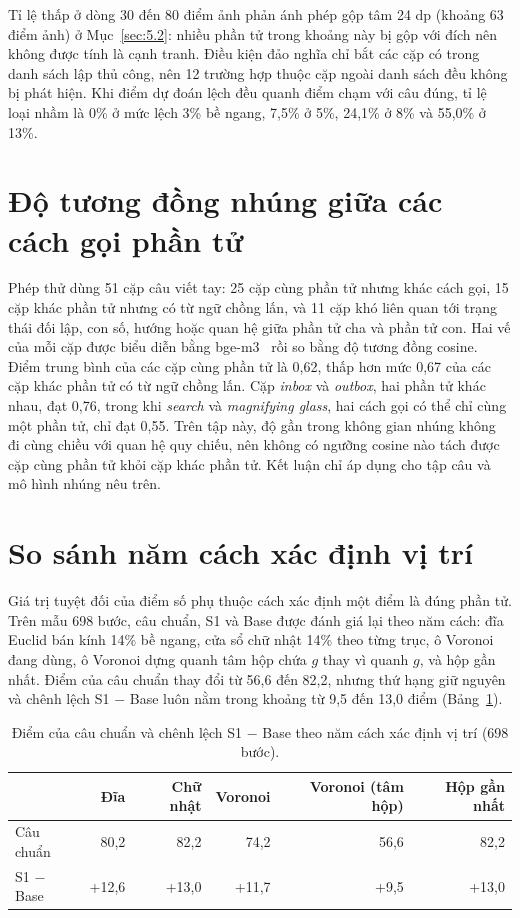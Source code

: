 Tỉ lệ thấp ở dòng 30 đến 80 điểm ảnh phản ánh phép gộp tâm 24 dp (khoảng 63 điểm ảnh) ở Mục~\ref{sec:5.2}: nhiều phần tử trong khoảng này bị gộp với đích nên không được tính là cạnh tranh. Điều kiện đảo nghĩa chỉ bắt các cặp có trong danh sách lập thủ công, nên 12 trường hợp thuộc cặp ngoài danh sách đều không bị phát hiện. Khi điểm dự đoán lệch đều quanh điểm chạm với câu đúng, tỉ lệ loại nhầm là 0\% ở mức lệch 3\% bề ngang, 7,5\% ở 5\%, 24,1\% ở 8\% và 55,0\% ở 13\%.

\section{Độ tương đồng nhúng giữa các cách gọi phần tử}\label{sec:B.2}

Phép thử dùng 51 cặp câu viết tay: 25 cặp cùng phần tử nhưng khác cách gọi, 15 cặp khác phần tử nhưng có từ ngữ chồng lấn, và 11 cặp khó liên quan tới trạng thái đối lập, con số, hướng hoặc quan hệ giữa phần tử cha và phần tử con. Hai vế của mỗi cặp được biểu diễn bằng bge-m3~\cite{bgem3} rồi so bằng độ tương đồng cosine. Điểm trung bình của các cặp cùng phần tử là 0,62, thấp hơn mức 0,67 của các cặp khác phần tử có từ ngữ chồng lấn. Cặp \emph{inbox} và \emph{outbox}, hai phần tử khác nhau, đạt 0,76, trong khi \emph{search} và \emph{magnifying glass}, hai cách gọi có thể chỉ cùng một phần tử, chỉ đạt 0,55. Trên tập này, độ gần trong không gian nhúng không đi cùng chiều với quan hệ quy chiếu, nên không có ngưỡng cosine nào tách được cặp cùng phần tử khỏi cặp khác phần tử. Kết luận chỉ áp dụng cho tập câu và mô hình nhúng nêu trên.

\section{So sánh năm cách xác định vị trí}\label{sec:B.3}

Giá trị tuyệt đối của điểm số phụ thuộc cách xác định một điểm là đúng phần tử. Trên mẫu 698 bước, câu chuẩn, S1 và Base được đánh giá lại theo năm cách: đĩa Euclid bán kính 14\% bề ngang, cửa sổ chữ nhật 14\% theo từng trục, ô Voronoi đang dùng, ô Voronoi dựng quanh tâm hộp chứa $g$ thay vì quanh $g$, và hộp gần nhất. Điểm của câu chuẩn thay đổi từ 56,6 đến 82,2, nhưng thứ hạng giữ nguyên và chênh lệch S1 $-$ Base luôn nằm trong khoảng từ 9,5 đến 13,0 điểm (Bảng~\ref{tab:5.6}).

\begin{table}[htbp]
\centering\small
\caption{Điểm của câu chuẩn và chênh lệch S1 $-$ Base theo năm cách xác định vị trí (698 bước).}\label{tab:5.6}
\setlength{\tabcolsep}{4pt}
\begin{tabularx}{\textwidth}{@{}>{\raggedright\arraybackslash}Xrrrrr@{}}
\toprule
 & \textbf{Đĩa} & \textbf{Chữ nhật} & \textbf{Voronoi} & \textbf{Voronoi (tâm hộp)} & \textbf{Hộp gần nhất} \\
\midrule
Câu chuẩn & 80,2 & 82,2 & 74,2 & 56,6 & 82,2 \\
S1 $-$ Base & +12,6 & +13,0 & +11,7 & +9,5 & +13,0 \\
\bottomrule
\end{tabularx}
\end{table}


